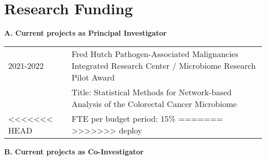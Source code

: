 \documentclass[10pt]{article}
\begin{document}

\section*{Research Funding }

\textbf{A. Current projects as Principal Investigator}
\begin{table}[H]
\hskip0.9cm\begin{tabular}{p{1.6cm}p{12cm}}
2021-2022 & Fred Hutch Pathogen-Associated Malignancies Integrated Research Center / Microbiome Research Pilot Award  \\
& Title: Statistical Methods for Network-based Analysis of the Colorectal Cancer Microbiome \\
<<<<<<< HEAD
& FTE per budget period: 15\%
=======
>>>>>>> deploy
\end{tabular}
\end{table}


\textbf{B. Current projects as Co-Investigator}
\end{document}
